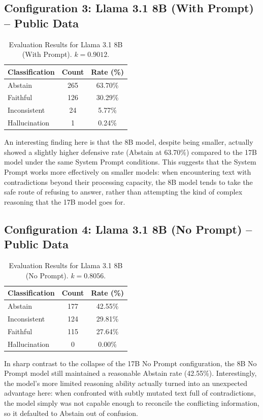 \documentclass[
    a4paper,
    man,
    floatsintext
]{glossaPX2}
\begin{document}
\subsection{Configuration 3: Llama 3.1 8B (With Prompt) -- Public Data}
\begin{table}[H]
\centering
\caption{Evaluation Results for Llama 3.1 8B (With Prompt). $k = 0.9012$.}
\label{tab:8b_prompt}
\begin{tabular}{lcc}
\toprule
\textbf{Classification} & \textbf{Count} & \textbf{Rate (\%)} \\
\midrule
Abstain & 265 & 63.70\% \\
Faithful & 126 & 30.29\% \\
Inconsistent & 24 & 5.77\% \\
Hallucination & 1 & 0.24\% \\
\bottomrule
\end{tabular}
\end{table}
An interesting finding here is that the 8B model, despite being smaller, actually showed a slightly higher defensive rate (Abstain at 63.70\%) compared to the 17B model under the same System Prompt conditions. This suggests that the System Prompt works more effectively on smaller models: when encountering text with contradictions beyond their processing capacity, the 8B model tends to take the safe route of refusing to answer, rather than attempting the kind of complex reasoning that the 17B model goes for.

\subsection{Configuration 4: Llama 3.1 8B (No Prompt) -- Public Data}
\begin{table}[H]
\centering
\caption{Evaluation Results for Llama 3.1 8B (No Prompt). $k = 0.8056$.}
\label{tab:8b_noprompt}
\begin{tabular}{lcc}
\toprule
\textbf{Classification} & \textbf{Count} & \textbf{Rate (\%)} \\
\midrule
Abstain & 177 & 42.55\% \\
Inconsistent & 124 & 29.81\% \\
Faithful & 115 & 27.64\% \\
Hallucination & 0 & 0.00\% \\
\bottomrule
\end{tabular}
\end{table}
In sharp contrast to the collapse of the 17B No Prompt configuration, the 8B No Prompt model still maintained a reasonable Abstain rate (42.55\%). Interestingly, the model's more limited reasoning ability actually turned into an unexpected advantage here: when confronted with subtly mutated text full of contradictions, the model simply was not capable enough to reconcile the conflicting information, so it defaulted to Abstain out of confusion.
\end{document}

